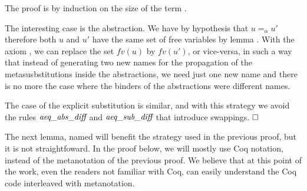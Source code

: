  The proof is by induction on the size of the term .
\begin{coqdoccode}
\end{coqdoccode}
The interesting case is the abstraction. We have by hypothesis that $u =_\alpha u'$ therefore both $u$ and $u'$ have the same set of free variables by lemma . With the axiom , we can replace the set $fv(u)$ by $fv(u')$, or vice-versa, in such a way that instead of generating two new names for the propagation of the metasusbstitutions inside the abstractions, we need just one new name and there is no more the case where the binders of the abstractions were different names. 
\begin{coqdoccode}
\end{coqdoccode}
The case of the explicit substitution is similar, and with this strategy we avoid the rules $\mbox{\it aeq}\_\mbox{\it abs}\_\mbox{\it diff}$ and $\mbox{\it aeq}\_\mbox{\it sub}\_\mbox{\it diff}$ that introduce swappings. $\hfill\Box$
\begin{coqdoccode}
\end{coqdoccode}
\newline 
\begin{coqdoccode}
\coqdocemptyline
\coqdocemptyline
\end{coqdoccode}
The next lemma, named  will benefit the strategy used in the previous proof, but it is not straightfoward. In the proof below, we will mostly use Coq notation, instead of the metanotation of the previous proof. We believe that at this point of the work, even the readers not familiar with Coq, can easily understand the Coq code interleaved with metanotation. 
